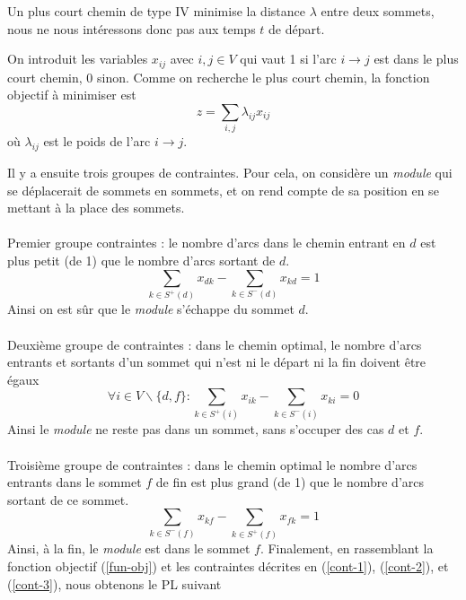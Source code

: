 \documentclass{article}
\begin{document}
Un plus court chemin de type IV minimise la distance $\lambda$ entre deux sommets, nous ne
nous intéressons donc pas aux temps $t$ de départ.

On introduit les variables $x_{ij}$ avec $i,j \in V $ qui vaut 1 si
l'arc $i\rightarrow j$ est dans le plus court chemin, 0 sinon.
Comme on recherche le plus court chemin, la fonction objectif à minimiser est
\begin{equation}
    \label{fun-obj}
    z = \sum_{i,j}\lambda_{ij}x_{ij}
\end{equation}
où $\lambda_{ij}$ est le poids de l'arc $i \rightarrow j$.

Il y a ensuite trois groupes de contraintes. Pour cela, on considère un
\textit{module} qui se déplacerait de sommets en sommets, et on rend compte de
sa position en se mettant à la place des sommets.
\\
\\
Premier groupe contraintes : le nombre d'arcs dans le chemin entrant en $d$ est
plus petit (de 1) que le nombre
d'arcs sortant de $d$.
\begin{equation}
    \label{cont-1}
    \sum_{k\in S^+(d)}x_{dk} - \sum_{k\in S^-(d)}x_{kd} = 1
\end{equation}
Ainsi on est sûr que le \textit{module} s'échappe du sommet $d$.
\\
\\
Deuxième groupe de contraintes : dans le chemin optimal, le nombre d'arcs entrants
et sortants d'un sommet qui n'est ni le départ ni la fin doivent être égaux
\begin{equation}
    \label{cont-2}
    \forall i \in V \backslash \{d, f\}: \sum_{k\in S^+(i)}x_{ik} - \sum_{k\in S^-(i)}x_{ki} = 0
\end{equation}
Ainsi le \textit{module} ne reste pas dans un sommet, sans s'occuper des cas $d$ et $f$.
\\
\\
Troisième groupe de contraintes : dans le chemin optimal le nombre d'arcs
entrants dans le sommet $f$ de fin est plus grand (de 1) que le nombre d'arcs
sortant de ce sommet.
\begin{equation}
    \label{cont-3}
    \sum_{k\in S^-(f)}x_{kf} - \sum_{k\in S^+(f)}x_{fk} = 1
\end{equation}
Ainsi, à la fin, le \textit{module} est dans le sommet $f$. Finalement, en
rassemblant la fonction objectif (\ref{fun-obj}) et les contraintes décrites en
(\ref{cont-1}), (\ref{cont-2}), et (\ref{cont-3}), nous obtenons le PL suivant
\end{document}
